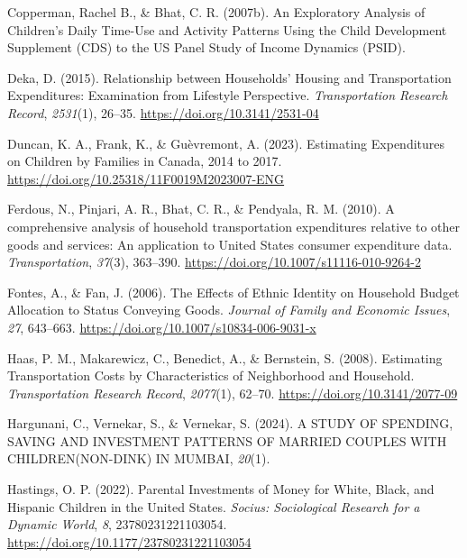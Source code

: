 \documentclass[
]{agujournal2019}
\newlength{\cslhangindent}
\newenvironment{CSLReferences}[2] %
 {\begin{list}{}{%
  \setlength{\itemindent}{0pt}
  \setlength{\leftmargin}{0pt}
  \setlength{\parsep}{0pt}
  \ifodd #1
   \setlength{\leftmargin}{\cslhangindent}
   \setlength{\itemindent}{-1\cslhangindent}
  \fi
  \setlength{\itemsep}{#2\baselineskip}}}
 {\end{list}}
\begin{document}
\begin{CSLReferences}{1}{0}
Copperman, Rachel B., \& Bhat, C. R. (2007b). An {Exploratory}
{Analysis} of {Children}'s {Daily} {Time}-{Use} and {Activity}
{Patterns} {Using} the {Child} {Development} {Supplement} ({CDS}) to the
{US} {Panel} {Study} of {Income} {Dynamics} ({PSID}).

Deka, D. (2015). Relationship between {Households}' {Housing} and
{Transportation} {Expenditures}: {Examination} from {Lifestyle}
{Perspective}. \emph{Transportation Research Record}, \emph{2531}(1),
26--35. \url{https://doi.org/10.3141/2531-04}

Duncan, K. A., Frank, K., \& Guèvremont, A. (2023). Estimating
{Expenditures} on {Children} by {Families} in {Canada}, 2014 to 2017.
\url{https://doi.org/10.25318/11F0019M2023007-ENG}

Ferdous, N., Pinjari, A. R., Bhat, C. R., \& Pendyala, R. M. (2010). A
comprehensive analysis of household transportation expenditures relative
to other goods and services: An application to {United} {States}
consumer expenditure data. \emph{Transportation}, \emph{37}(3),
363--390. \url{https://doi.org/10.1007/s11116-010-9264-2}

Fontes, A., \& Fan, J. (2006). The {Effects} of {Ethnic} {Identity} on
{Household} {Budget} {Allocation} to {Status} {Conveying} {Goods}.
\emph{Journal of Family and Economic Issues}, \emph{27}, 643--663.
\url{https://doi.org/10.1007/s10834-006-9031-x}

Haas, P. M., Makarewicz, C., Benedict, A., \& Bernstein, S. (2008).
Estimating {Transportation} {Costs} by {Characteristics} of
{Neighborhood} and {Household}. \emph{Transportation Research Record},
\emph{2077}(1), 62--70. \url{https://doi.org/10.3141/2077-09}

Hargunani, C., Vernekar, S., \& Vernekar, S. (2024). A {STUDY} {OF}
{SPENDING}, {SAVING} {AND} {INVESTMENT} {PATTERNS} {OF} {MARRIED}
{COUPLES} {WITH} {CHILDREN}({NON}-{DINK}) {IN} {MUMBAI}, \emph{20}(1).

Hastings, O. P. (2022). Parental {Investments} of {Money} for {White},
{Black}, and {Hispanic} {Children} in the {United} {States}.
\emph{Socius: Sociological Research for a Dynamic World}, \emph{8},
23780231221103054. \url{https://doi.org/10.1177/23780231221103054}


\end{CSLReferences}
\end{document}
